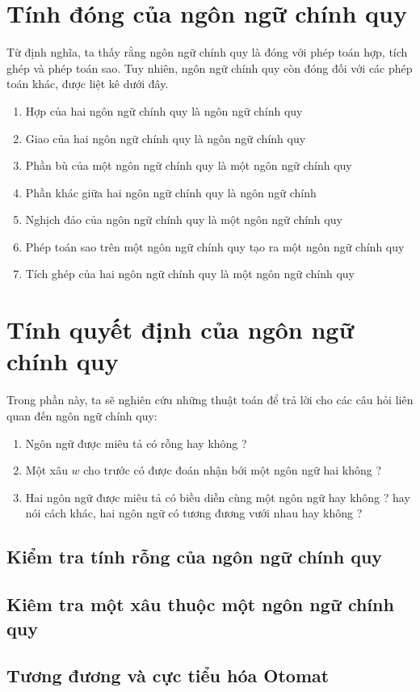 \documentclass[14pt]{extreport}
\begin{document}
\section{Tính đóng của ngôn ngữ chính quy}
Từ định nghĩa, ta thấy rằng ngôn ngữ chính quy là đóng với phép toán hợp, tích ghép và phép toán sao. Tuy nhiên, ngôn ngữ chính quy còn đóng đối với các phép toán khác, được liệt kê dưới đây.
\begin{enumerate}
\item Hợp của hai ngôn ngữ chính quy là ngôn ngữ chính quy
\item Giao của hai ngôn ngữ chính quy là ngôn ngữ chính quy
\item Phần bù của một ngôn ngữ chính quy là một ngôn ngữ chính quy
\item Phần khác giữa hai ngôn ngữ chính quy là ngôn ngữ chính
\item Nghịch đảo của ngôn ngữ chính quy là một ngôn ngữ chính quy
\item Phép toán sao trên một ngôn ngữ chính quy tạo ra một ngôn ngữ chính quy
\item Tích ghép của hai ngôn ngữ chính quy là một ngôn ngữ chính quy
\end{enumerate}
\section{Tính quyết định của ngôn ngữ chính quy}
Trong phần này, ta sẽ nghiên cứu những thuật toán để trả lời cho các câu hỏi liên quan đến ngôn ngữ chính quy:
\begin{enumerate}
\item Ngôn ngữ được miêu tả có rỗng hay không ?
\item Một xâu $w$ cho trước có được đoán nhận bới một ngôn ngữ hai không ?
\item Hai ngôn ngữ được miêu tả có biều diễn cùng một ngôn ngữ hay không ? hay nói cách khác, hai ngôn ngữ có tương đương vưới nhau hay không ?
\end{enumerate}
\subsection{Kiểm tra tính rỗng của ngôn ngữ chính quy}
\subsection{Kiêm tra một xâu thuộc một ngôn ngữ chính quy}
\subsection{Tương đương và cực tiểu hóa Otomat}
\end{document}
